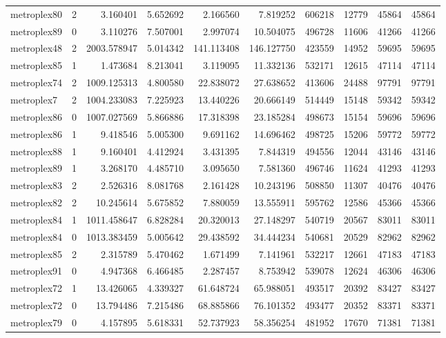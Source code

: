 \begin{longtable}{|l|r|r|r|r|r|r|r|r|r|}
metroplex80 & 2 & 3.160401 & 5.652692 & 2.166560 & 7.819252 & 606218 & 12779 & 45864 & 45864 \\
metroplex89 & 0 & 3.110276 & 7.507001 & 2.997074 & 10.504075 & 496728 & 11606 & 41266 & 41266 \\
metroplex48 & 2 & 2003.578947 & 5.014342 & 141.113408 & 146.127750 & 423559 & 14952 & 59695 & 59695 \\
metroplex85 & 1 & 1.473684 & 8.213041 & 3.119095 & 11.332136 & 532171 & 12615 & 47114 & 47114 \\
metroplex74 & 2 & 1009.125313 & 4.800580 & 22.838072 & 27.638652 & 413606 & 24488 & 97791 & 97791 \\
metroplex7 & 2 & 1004.233083 & 7.225923 & 13.440226 & 20.666149 & 514449 & 15148 & 59342 & 59342 \\
metroplex86 & 0 & 1007.027569 & 5.866886 & 17.318398 & 23.185284 & 498673 & 15154 & 59696 & 59696 \\
metroplex86 & 1 & 9.418546 & 5.005300 & 9.691162 & 14.696462 & 498725 & 15206 & 59772 & 59772 \\
metroplex88 & 1 & 9.160401 & 4.412924 & 3.431395 & 7.844319 & 494556 & 12044 & 43146 & 43146 \\
metroplex89 & 1 & 3.268170 & 4.485710 & 3.095650 & 7.581360 & 496746 & 11624 & 41293 & 41293 \\
metroplex83 & 2 & 2.526316 & 8.081768 & 2.161428 & 10.243196 & 508850 & 11307 & 40476 & 40476 \\
metroplex82 & 2 & 10.245614 & 5.675852 & 7.880059 & 13.555911 & 595762 & 12586 & 45366 & 45366 \\
metroplex84 & 1 & 1011.458647 & 6.828284 & 20.320013 & 27.148297 & 540719 & 20567 & 83011 & 83011 \\
metroplex84 & 0 & 1013.383459 & 5.005642 & 29.438592 & 34.444234 & 540681 & 20529 & 82962 & 82962 \\
metroplex85 & 2 & 2.315789 & 5.470462 & 1.671499 & 7.141961 & 532217 & 12661 & 47183 & 47183 \\
metroplex91 & 0 & 4.947368 & 6.466485 & 2.287457 & 8.753942 & 539078 & 12624 & 46306 & 46306 \\
metroplex72 & 1 & 13.426065 & 4.339327 & 61.648724 & 65.988051 & 493517 & 20392 & 83427 & 83427 \\
metroplex72 & 0 & 13.794486 & 7.215486 & 68.885866 & 76.101352 & 493477 & 20352 & 83371 & 83371 \\
metroplex79 & 0 & 4.157895 & 5.618331 & 52.737923 & 58.356254 & 481952 & 17670 & 71381 & 71381 \\

\end{longtable}
